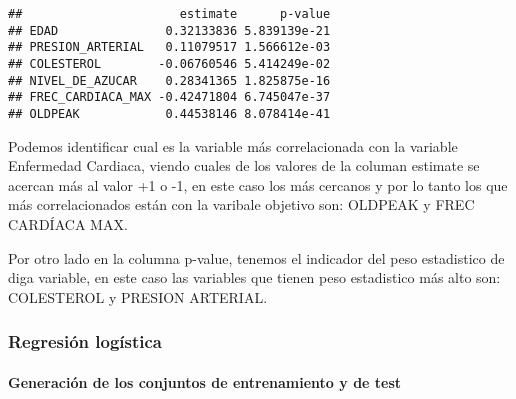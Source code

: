 \documentclass[
]{article}
\newenvironment{Shaded}{\begin{snugshade}}{\end{snugshade}}
\newcommand{\AttributeTok}[1]{\textcolor[rgb]{0.80,0.80,0.80}{#1}}
\newcommand{\DecValTok}[1]{\textcolor[rgb]{0.86,0.86,0.80}{#1}}
\newcommand{\FunctionTok}[1]{\textcolor[rgb]{0.94,0.94,0.56}{#1}}
\newcommand{\NormalTok}[1]{\textcolor[rgb]{0.80,0.80,0.80}{#1}}
\newcommand{\OtherTok}[1]{\textcolor[rgb]{0.94,0.94,0.56}{#1}}
\newcommand{\SpecialCharTok}[1]{\textcolor[rgb]{0.86,0.64,0.64}{#1}}
\begin{document}
\begin{verbatim}
##                      estimate      p-value
## EDAD               0.32133836 5.839139e-21
## PRESION_ARTERIAL   0.11079517 1.566612e-03
## COLESTEROL        -0.06760546 5.414249e-02
## NIVEL_DE_AZUCAR    0.28341365 1.825875e-16
## FREC_CARDIACA_MAX -0.42471804 6.745047e-37
## OLDPEAK            0.44538146 8.078414e-41
\end{verbatim}

Podemos identificar cual es la variable más correlacionada con la
variable Enfermedad Cardiaca, viendo cuales de los valores de la columan
estimate se acercan más al valor +1 o -1, en este caso los más cercanos
y por lo tanto los que más correlacionados están con la varibale
objetivo son: OLDPEAK y FREC CARDÍACA MAX.

Por otro lado en la columna p-value, tenemos el indicador del peso
estadistico de diga variable, en este caso las variables que tienen peso
estadistico más alto son: COLESTEROL y PRESION ARTERIAL.

\hypertarget{regresiuxf3n-loguxedstica}{%
\subsubsection{Regresión logística}\label{regresiuxf3n-loguxedstica}}

\hypertarget{generaciuxf3n-de-los-conjuntos-de-entrenamiento-y-de-test}{%
\paragraph{Generación de los conjuntos de entrenamiento y de
test}\label{generaciuxf3n-de-los-conjuntos-de-entrenamiento-y-de-test}}

\begin{Shaded}
\end{Shaded}
\end{document}
